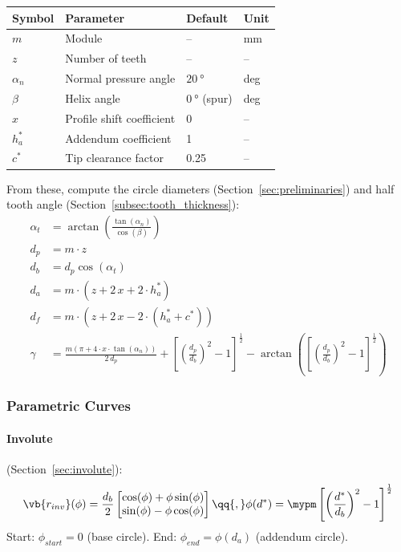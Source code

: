 \begin{center}
\begin{tabular}{@{}llll@{}}
    \textbf{Symbol} & \textbf{Parameter} & \textbf{Default} & \textbf{Unit} \\
    \hline
    $m$         & Module                    & --            & mm \\
    $z$         & Number of teeth           & --            & -- \\
    $\alpha_n$  & Normal pressure angle     & $\SI{20}{\degree}$ & deg \\
    $\beta$     & Helix angle               & $\SI{0}{\degree}$ (spur) & deg \\
    $x$         & Profile shift coefficient & 0             & -- \\
    $h_a^*$     & Addendum coefficient      & 1             & -- \\
    $c^*$       & Tip clearance factor      & 0.25          & -- \\
\end{tabular}
\end{center}

From these, compute the circle diameters (Section~\ref{sec:preliminaries}) and half tooth angle (Section~\ref{subsec:tooth_thickness}):
\begin{align}
    \alpha_t &= \arctan\!\left(\frac{\tan(\alpha_n)}{\cos(\beta)}\right) \\
    d_p &= m \cdot z \\
    d_b &= d_p \cos(\alpha_t) \\
    d_a &= m\cdot(z + 2\,x + 2\cdot h_a^*) \\
    d_f &= m\cdot(z + 2\,x - 2\cdot(h_a^*+c^*)) \\
    \gamma &= \frac{m\left(\pi + 4 \cdot x \cdot \tan(\alpha_n)\right)}{2\,d_p} + \left[\left(\frac{d_p}{d_b}\right)^2 - 1\right]^{\tfrac{1}{2}} - \arctan\left(\left[\left(\frac{d_p}{d_b}\right)^2 - 1\right]^{\tfrac{1}{2}}\right)
\end{align}

\subsubsection{Parametric Curves}

\paragraph{Involute} (Section~\ref{sec:involute}):
\begin{equation}
    \vb{r_{inv}}(\phi) = \frac{d_b}{2} \begin{bmatrix}
        \cos(\phi) + \phi\sin(\phi) \\
        \sin(\phi) - \phi\cos(\phi)
    \end{bmatrix}
    \qq{,}
    \phi(d^*) = \mypm\left[\left(\frac{d^*}{d_b}\right)^2 - 1\right]^{\frac{1}{2}}
\end{equation}
Start: $\phi_{start} = 0$ (base circle). \quad End: $\phi_{end} = \phi(d_a)$ (addendum circle).

